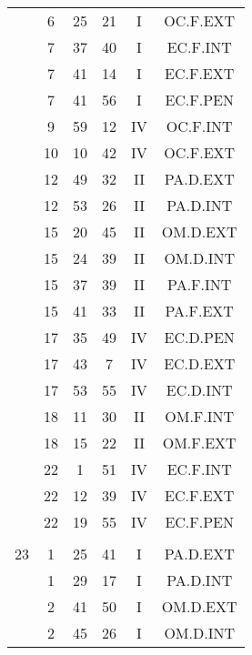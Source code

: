 \documentclass[12pt, a4paper]{article}
\begin{document}
\begin{multicols}{3}
{\begin{tabular}{c c c c c c}
	 	 	 	 & 6 & 25 & 21 & I & OC.F.EXT\\%
	 	 	 	 & 7 & 37 & 40 & I & EC.F.INT\\%
	 	 	 	 & 7 & 41 & 14 & I & EC.F.EXT\\%
	 	 	 	 & 7 & 41 & 56 & I & EC.F.PEN\\%
	 	 	 	 & 9 & 59 & 12 & IV & OC.F.INT\\%
	 	 	 	 & 10 & 10 & 42 & IV & OC.F.EXT\\%
	 	 	 	 & 12 & 49 & 32 & II & PA.D.EXT\\%
	 	 	 	 & 12 & 53 & 26 & II & PA.D.INT\\%
	 	 	 	 & 15 & 20 & 45 & II & OM.D.EXT\\%
	 	 	 	 & 15 & 24 & 39 & II & OM.D.INT\\%
	 	 	 	 & 15 & 37 & 39 & II & PA.F.INT\\%
	 	 	 	 & 15 & 41 & 33 & II & PA.F.EXT\\%
	 	 	 	 & 17 & 35 & 49 & IV & EC.D.PEN\\%
	 	 	 	 & 17 & 43 & 7 & IV & EC.D.EXT\\%
	 	 	 	 & 17 & 53 & 55 & IV & EC.D.INT\\%
	 	 	 	 & 18 & 11 & 30 & II & OM.F.INT\\%
	 	 	 	 & 18 & 15 & 22 & II & OM.F.EXT\\%
	 	 	 	 & 22 & 1 & 51 & IV & EC.F.INT\\%
	 	 	 	 & 22 & 12 & 39 & IV & EC.F.EXT\\%
	 	 	 	 & 22 & 19 & 55 & IV & EC.F.PEN\\%
	 	 	 	 & & & & & \\%
	 	 	 	23 & 1 & 25 & 41 & I & PA.D.EXT\\%
	 	 	 	 & 1 & 29 & 17 & I & PA.D.INT\\%
	 	 	 	 & 2 & 41 & 50 & I & OM.D.EXT\\%
	 	 	 	 & 2 & 45 & 26 & I & OM.D.INT\\%
	 	 \end{tabular}
 	}
\end{multicols}
\end{document}
